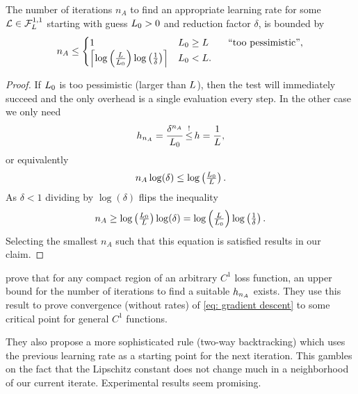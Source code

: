 \begin{lemma}
	The number of iterations \(n_A\) to find an appropriate learning rate for some
	\(\mathcal{L}\in\mathcal{F}^{1,1}_{L}\) starting with guess \(L_0>0\) and
	reduction factor \(\delta\), is bounded by
	\begin{align*}
		n_A \le \begin{cases}
			1 & L_0 \ge L \qquad \text{``too pessimistic''}, \\
			\left\lceil \log\left(\frac{L}{ L_0 }\right)\log\left(\frac1\delta\right) \right\rceil
			& L_0 < L.
		\end{cases}
	\end{align*}
\end{lemma}
\begin{proof}
	If \(L_0\) is too pessimistic (larger than \(L\)), then the test
	will immediately succeed and the only overhead is a single evaluation every step.
	In the other case we only need
	\begin{align*}
		\lr_{n_A} = \frac{\delta^{n_A}}{\ubound_0} \xle{!} \lr = \frac{1}{\ubound},
	\end{align*}
	or equivalently
	\begin{align*}
		n_A \log(\delta) \le \log\left(\tfrac{ L_0 }{ L }\right).
	\end{align*}
	As \(\delta<1\) dividing by \(\log(\delta)\) flips the inequality
	\begin{align*}
		n_A \ge \log\left(\tfrac{ L_0 }{ L }\right)\log(\delta)
		= \log\left(\tfrac{L}{ L_0 }\right)\log\left(\tfrac1\delta\right).
	\end{align*}
	Selecting the
	smallest \(n_A\) such that this equation is satisfied results in our claim.
\end{proof}

\textcite[Lemma 3.1]{truongBacktrackingGradientDescent2019} prove that for any
compact region of an arbitrary \(C^1\) loss function, an upper bound for the
number of iterations to find a suitable \(h_{n_A}\) exists. They use this
result to prove convergence (without rates) of \ref{eq: gradient descent} to
some critical point for general \(C^1\) functions.

They also propose a more sophisticated rule (two-way backtracking) which uses
the previous learning rate as a starting point for the next iteration. This
gambles on the fact that the Lipschitz constant does not change much in a
neighborhood of our current iterate. Experimental results seem promising.

